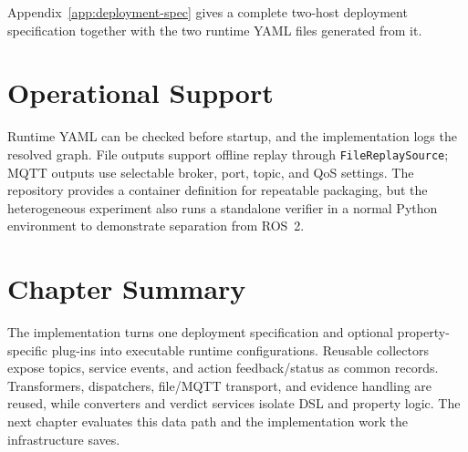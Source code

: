 Appendix~\ref{app:deployment-spec} gives a complete two-host deployment
specification together with the two runtime YAML files generated from it.

\section{Operational Support}

Runtime YAML can be checked before startup, and the implementation logs the
resolved graph. File outputs support offline replay through
\texttt{FileReplaySource}; MQTT outputs use selectable broker, port, topic, and
QoS settings. The repository provides a container definition for repeatable
packaging, but the heterogeneous experiment also runs a standalone verifier in
a normal Python environment to demonstrate separation from ROS~2.

\section{Chapter Summary}

The implementation turns one deployment specification and optional
property-specific plug-ins into executable runtime configurations. Reusable
collectors expose topics, service events, and action feedback/status as common
records. Transformers, dispatchers, file/MQTT transport, and evidence handling
are reused, while converters and verdict services isolate DSL and property
logic. The next chapter evaluates this data path and the implementation work
the infrastructure saves.
